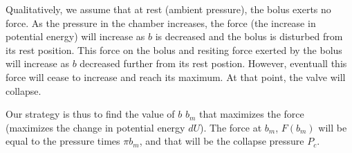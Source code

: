 \documentclass[]{asme2ej}
\begin{document}










Qualitatively, we assume that at rest (ambient pressure), the bolus exerts no force. As the
pressure in the chamber increases, the force (the increase in potential energy) will increase
as $b$ is decreased and the bolus is disturbed from its rest position. This force on the
bolus and resiting force exerted by the bolus will increase
as $b$ decreased further from its rest postion. However, eventuall this force will cease to
increase and reach its maximum. At that point, the valve will collapse.

Our strategy is thus to find the value of $b$ $b_m$ that maximizes the force (maximizes the change in
potential energy $dU$). The force at $b_m$, $F(b_m)$ will be equal to the pressure times $\pi b_m$, and
that will be the collapse pressure $P_c$.
\end{document}
